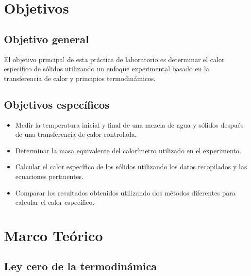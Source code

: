 \documentclass[letterpaper, 12pt]{article}
\begin{document}
\section{Objetivos}

\subsection{Objetivo general}

El objetivo principal de esta práctica de laboratorio es
determinar el calor específico de sólidos utilizando un
enfoque experimental basado en la transferencia de calor y
principios termodinámicos.

\subsection{Objetivos específicos}

\begin{itemize}[label=$\triangleright$]
      \item Medir la temperatura inicial y final de una mezcla de agua
            y sólidos después de una transferencia de calor controlada.

      \item Determinar la masa equivalente del calorímetro utilizado en
            el experimento.

      \item Calcular el calor específico de los sólidos utilizando los
            datos recopilados y las ecuaciones pertinentes.

      \item Comparar los resultados obtenidos utilizando dos métodos
            diferentes para calcular el calor específico.
\end{itemize}

\section{Marco Teórico}

\subsection{Ley cero de la termodinámica~\cite{Fernández}}
\end{document}
